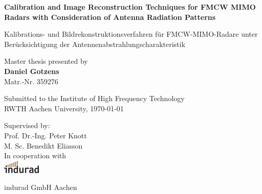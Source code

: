 \begin{titlepage}
    \begin{center}
        \vfill

        \Huge
        \textbf{Calibration and Image Reconstruction Techniques
            for FMCW MIMO Radars with Consideration of Antenna Radiation Patterns}
        \vspace{0.5cm}

        \large
        Kalibrations- und Bildrekonstruktionsverfahren für FMCW-MIMO-Radare unter Berücksichtigung der Antennenabstrahlungscharakteristik
        \vspace{1.5cm}

        Master thesis presented by \\
        \textbf{Daniel Gotzens} \\
        Matr.-Nr. 359276

        \vfill

        \normalsize
        Submitted to the Institute of High Frequency Technology \\
        RWTH Aachen University,
        \today\\
        \vfill

        Supervised by: \\
        \large
        Prof. Dr.-Ing. Peter Knott \\
        M. Sc. Benedikt Eliasson \\

        \vspace{1cm}
        In cooperation with \\

        \includegraphics[height=18pt]{../figures/indurad-logo.png}

        indurad GmbH
        Aachen

    \end{center}
\end{titlepage}
\afterpage{\null\newpage}

